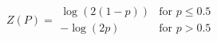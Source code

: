 

\[
Z(P) = \begin{array}{ll} \log(2(1-p)) & \mbox{for $p \le 0.5$} \\ -\log(2p) & \mbox{for $p > 0.5$} \end{array}
\]



